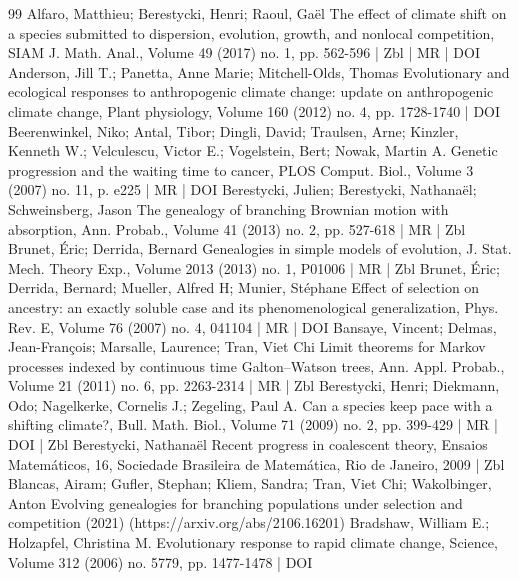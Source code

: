 \begin{thebibliography}{99}
Alfaro, Matthieu; Berestycki, Henri; Raoul, Gaël The effect of climate shift on a species submitted to dispersion, evolution, growth, and nonlocal competition, SIAM J. Math. Anal., Volume 49 (2017) no. 1, pp. 562-596 | Zbl | MR | DOI
Anderson, Jill T.; Panetta, Anne Marie; Mitchell-Olds, Thomas Evolutionary and ecological responses to anthropogenic climate change: update on anthropogenic climate change, Plant physiology, Volume 160 (2012) no. 4, pp. 1728-1740 | DOI
Beerenwinkel, Niko; Antal, Tibor; Dingli, David; Traulsen, Arne; Kinzler, Kenneth W.; Velculescu, Victor E.; Vogelstein, Bert; Nowak, Martin A. Genetic progression and the waiting time to cancer, PLOS Comput. Biol., Volume 3 (2007) no. 11, p. e225 | MR | DOI
Berestycki, Julien; Berestycki, Nathanaël; Schweinsberg, Jason The genealogy of branching Brownian motion with absorption, Ann. Probab., Volume 41 (2013) no. 2, pp. 527-618 | MR | Zbl
Brunet, Éric; Derrida, Bernard Genealogies in simple models of evolution, J. Stat. Mech. Theory Exp., Volume 2013 (2013) no. 1, P01006 | MR | Zbl
Brunet, Éric; Derrida, Bernard; Mueller, Alfred H; Munier, Stéphane Effect of selection on ancestry: an exactly soluble case and its phenomenological generalization, Phys. Rev. E, Volume 76 (2007) no. 4, 041104 | MR | DOI
Bansaye, Vincent; Delmas, Jean-François; Marsalle, Laurence; Tran, Viet Chi Limit theorems for Markov processes indexed by continuous time Galton–Watson trees, Ann. Appl. Probab., Volume 21 (2011) no. 6, pp. 2263-2314 | MR | Zbl
Berestycki, Henri; Diekmann, Odo; Nagelkerke, Cornelis J.; Zegeling, Paul A. Can a species keep pace with a shifting climate?, Bull. Math. Biol., Volume 71 (2009) no. 2, pp. 399-429 | MR | DOI | Zbl
Berestycki, Nathanaël Recent progress in coalescent theory, Ensaios Matemáticos, 16, Sociedade Brasileira de Matemática, Rio de Janeiro, 2009 | Zbl
Blancas, Airam; Gufler, Stephan; Kliem, Sandra; Tran, Viet Chi; Wakolbinger, Anton Evolving genealogies for branching populations under selection and competition (2021) (https://arxiv.org/abs/2106.16201)
Bradshaw, William E.; Holzapfel, Christina M. Evolutionary response to rapid climate change, Science, Volume 312 (2006) no. 5779, pp. 1477-1478 | DOI

\end{thebibliography}
